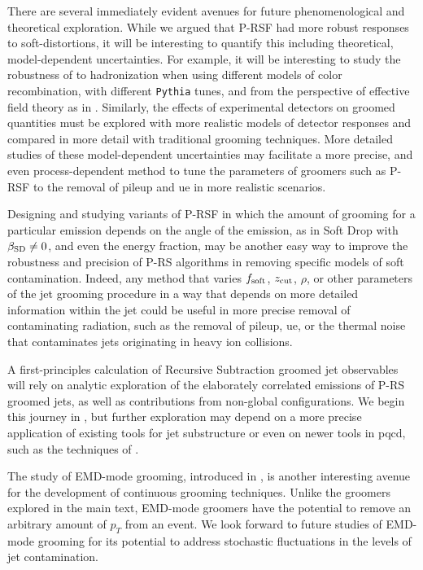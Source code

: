    There are several immediately evident avenues for future phenomenological and theoretical exploration.
    While we argued that P-RSF had more robust responses to \glspl{soft-distortion}, it will be interesting to quantify this including theoretical, model-dependent uncertainties.
   For example, it will be interesting to study the robustness of  to \gls{hadronization} when using different models of color recombination, with different \texttt{Pythia} tunes, and from the perspective of effective field theory as in .
   Similarly, the effects of experimental detectors on  groomed quantities must be explored with more realistic models of detector responses and compared in more detail with traditional grooming techniques.
   More detailed studies of these model-dependent uncertainties may facilitate a more precise, and even process-dependent method to tune the parameters of \PIRANHA{} groomers such as P-RSF to the removal of \gls{pileup} and \gls{ue} in more realistic scenarios.

   Designing and studying variants of P-RSF in which the amount of grooming for a particular emission depends on the angle of the emission, as in Soft Drop with \(\beta_{\rm SD} \neq 0\), and even the energy fraction, may be another easy way to improve the robustness and precision of P-RS algorithms in removing specific models of soft contamination.
   Indeed, any method that varies \(f_{\rm soft}\), \(z_{\rm cut}\), \(\rho\), or other parameters of the jet grooming procedure in a way that depends on more detailed information within the jet could be useful in more precise removal of contaminating radiation, such as the removal of \gls{pileup}, \gls{ue}, or the thermal noise that contaminates jets originating in heavy ion collisions.

       A first-principles calculation of Recursive Subtraction groomed jet observables will rely on analytic exploration of the elaborately correlated emissions of P-RS groomed jets, as well as contributions from non-global configurations.
    We begin this journey in , but further exploration may depend on a more precise application of existing tools for jet substructure or even on newer tools in \gls{pqcd}, such as the techniques of .

   The study of EMD-mode \PIRANHA{} grooming, introduced in , is another interesting avenue for the development of continuous grooming techniques.
   Unlike the \PIRANHA{} groomers explored in the main text, EMD-mode \PIRANHA{} groomers have the potential to remove an arbitrary amount of \(p_T\) from an event.
   We look forward to future studies of EMD-mode grooming for its potential to address stochastic fluctuations in the levels of jet contamination.

